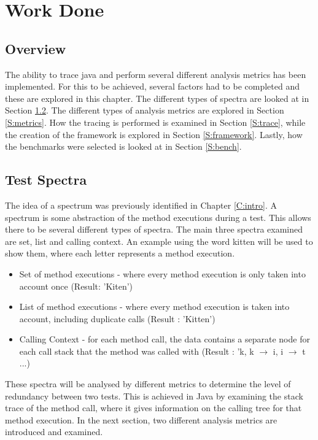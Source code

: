 \chapter{Work Done}\label{C:workdone}

\section{Overview}

The ability to trace java and perform several different analysis metrics has been implemented. For this to be achieved, several factors had to be completed and these are explored in this chapter. The different types of spectra are looked at in Section \ref{S:spectra}. The different types of analysis metrics are explored in Section \ref{S:metrics}. How the tracing is performed is examined in Section \ref{S:trace}, while the creation of the framework is explored in Section \ref{S:framework}. Lastly, how the benchmarks were selected is looked at in Section \ref{S:bench}.

\section{Test Spectra}
\label{S:spectra}

The idea of a spectrum was previously identified in Chapter \ref{C:intro}. A spectrum is some abstraction of the method executions during a test. This allows there to be several different types of spectra. The main three spectra examined are set, list and calling context. An example using the word kitten will be used to show them, where each letter represents a method execution.

\begin{itemize}
\item Set of method executions - where every method execution is only taken into account once (Result: 'Kiten')
\item List of method executions - where every method execution is taken into account, including duplicate calls (Result : 'Kitten')
\item Calling Context - for each method call, the data contains a separate node for each call stack that the method was called with \cite{callingcontext} (Result : 'k, k $\rightarrow$ i, i $\rightarrow$ t ...) 
\end{itemize}
These spectra will be analysed by different metrics to determine the level of redundancy between two tests. This is achieved in Java by examining the stack trace of the method call, where it gives information on the calling tree for that method execution. In the next section, two different analysis metrics are introduced and examined.

